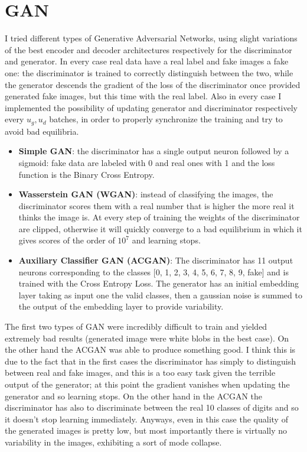 \documentclass[a4paper, 11pt]{article}
\begin{document}
\section{GAN}
  I tried different types of Generative Adversarial Networks, using slight variations of the best encoder and decoder architectures respectively for the discriminator and generator. In every case real data have a real label and fake images a fake one: the discriminator is trained to correctly distinguish between the two, while the generator descends the gradient of the loss of the discriminator once provided generated fake images, but this time with the real label. Also in every case I implemented the possibility of updating generator and discriminator respectively every $u_g, u_d$ batches, in order to properly synchronize the training and try to avoid bad equilibria.
  \begin{itemize}
    \item \textbf{Simple GAN}: the discriminator has a single output neuron followed by a sigmoid: fake data are labeled with 0 and real ones with 1 and the loss function is the Binary Cross Entropy.
    \item \textbf{Wasserstein GAN (WGAN)}: instead of classifying the images, the discriminator scores them with a real number that is higher the more real it thinks the image is. At every step of training the weights of the discriminator are clipped, otherwise it will quickly converge to a bad equilibrium in which it gives scores of the order of $10^7$ and learning stops.
    \item \textbf{Auxiliary Classifier GAN (ACGAN)}: The discriminator has 11 output neurons corresponding to the classes [0, 1, 2, 3, 4, 5, 6, 7, 8, 9, fake] and is trained with the Cross Entropy Loss. The generator has an initial embedding layer taking as input one the valid classes, then a gaussian noise is summed to the output of the embedding layer to provide variability.
  \end{itemize}

  The first two types of GAN were incredibly difficult to train and yielded extremely bad results (generated image were white blobs in the best case). On the other hand the ACGAN was able to produce something good. I think this is due to the fact that in the first cases the discriminator has simply to distinguish between real and fake images, and this is a too easy task given the terrible output of the generator; at this point the gradient vanishes when updating the generator and so learning stops. On the other hand in the ACGAN the discriminator has also to discriminate between the real 10 classes of digits and so it doesn't stop learning immediately. Anyways, even in this case the quality of the generated images is pretty low, but most importantly there is virtually no variability in the images, exhibiting a sort of mode collapse.
\end{document}
